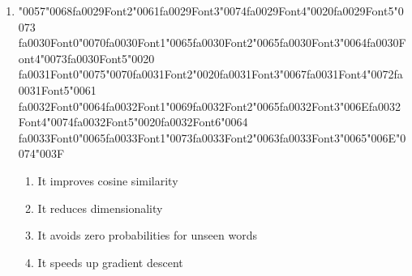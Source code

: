 \documentclass[12pt]{article}
\begin{document}
\begin{enumerate}[label=Q\arabic*.]
\item {\char"0057}{\char"0068}{\csname fa0029Font2\endcsname\char"0061}{\csname fa0029Font3\endcsname\char"0074}{\csname fa0029Font4\endcsname\char"0020}{\csname fa0029Font5\endcsname\char"0073} {\csname fa0030Font0\endcsname\char"0070}{\csname fa0030Font1\endcsname\char"0065}{\csname fa0030Font2\endcsname\char"0065}{\csname fa0030Font3\endcsname\char"0064}{\csname fa0030Font4\endcsname\char"0073}{\csname fa0030Font5\endcsname\char"0020} {\csname fa0031Font0\endcsname\char"0075}{\char"0070}{\csname fa0031Font2\endcsname\char"0020}{\csname fa0031Font3\endcsname\char"0067}{\csname fa0031Font4\endcsname\char"0072}{\csname fa0031Font5\endcsname\char"0061} {\csname fa0032Font0\endcsname\char"0064}{\csname fa0032Font1\endcsname\char"0069}{\csname fa0032Font2\endcsname\char"0065}{\csname fa0032Font3\endcsname\char"006E}{\csname fa0032Font4\endcsname\char"0074}{\csname fa0032Font5\endcsname\char"0020}{\csname fa0032Font6\endcsname\char"0064} {\csname fa0033Font0\endcsname\char"0065}{\csname fa0033Font1\endcsname\char"0073}{\csname fa0033Font2\endcsname\char"0063}{\csname fa0033Font3\endcsname\char"0065}{\char"006E}{\char"0074}{\char"003F}
\begin{enumerate}[label=(\Alph*)]
    \item It improves cosine similarity
    \item It reduces dimensionality
    \item It avoids zero probabilities for unseen words
    \item It speeds up gradient descent
\end{enumerate}

\end{enumerate}
\end{document}
